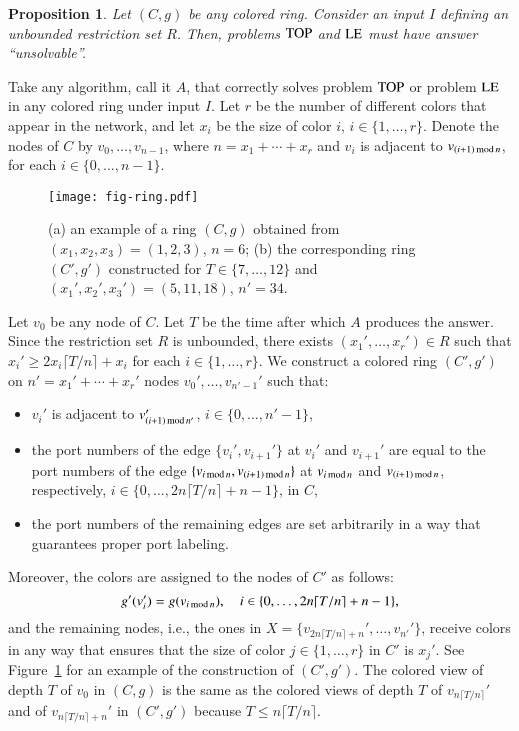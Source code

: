 \documentclass[a4paper,10pt]{article}
\newtheorem{proposition}{Proposition}[section]
\newcommand{\modulo}{\,\textup{mod}\,}
\newcommand{\problemLE}{\textup{LE}}
\newcommand{\problemTOP}{\textup{TOP}}
\newenvironment{proof}[1][Proof]
{\par\noindent{\bf #1:} }{\hspace*{\fill}\nolinebreak{$\Box$}\bigskip\par}
\begin{document}
\begin{proposition}
Let $(C,g)$ be any colored ring.
Consider an input $I$ defining an unbounded restriction set $R$.
Then, problems $\problemTOP$ and $\problemLE$ must have answer ``unsolvable''.
\end{proposition}
\begin{proof}
Take any algorithm, call it $A$, that correctly solves problem $\problemTOP$ or problem $\problemLE$ in any colored ring under input $I$.
Let $r$ be the number of different colors that appear in the network, and let $x_i$ be the size of color $i$, $i\in\{1,\ldots,r\}$.
Denote the nodes of $C$ by $v_0,\ldots,v_{n-1}$, where $n=x_1+\cdots+x_r$ and $v_i$ is adjacent to $v_{(i+1)\modulo n}$, for each $i\in\{0,\ldots,n-1\}$.
\begin{figure}[htb]
\begin{center}
\texttt{[image: fig-ring.pdf]}
\caption{(a) an example of a ring $(C,g)$ obtained from $(x_1,x_2,x_3)=(1,2,3)$, $n=6$; (b) the corresponding ring $(C',g')$ constructed for $T\in\{7,\ldots,12\}$ and $(x_1',x_2',x_3')=(5,11,18)$, $n'=34$.}
\label{fig:ring}
\end{center}
\end{figure}

Let $v_0$ be any node of $C$.
Let $T$ be the time after which $A$ produces the answer.
Since the restriction set $R$ is unbounded, there exists $(x_1',\ldots,x_r')\in R$ such that $x_i'\geq 2x_i\lceil T/n\rceil+x_i$ for each $i\in\{1,\ldots,r\}$.
We construct a colored ring $(C',g')$ on $n'=x_1'+\cdots+x_r'$ nodes $v_0',\ldots,v_{n'-1}'$ such that:
\begin{itemize}
 \item $v_i'$ is adjacent to $v_{(i+1)\modulo n'}'$, $i\in\{0,\ldots,n'-1\}$,
 \item the port numbers of the edge $\{v_i',v_{i+1}'\}$ at $v_i'$ and $v_{i+1}'$ are equal to the port numbers of the edge $\{v_{i\modulo n},v_{(i+1)\modulo n}\}$ at $v_{i\modulo n}$ and $v_{(i+1)\modulo n}$, respectively, $i\in\{0,\ldots,2n\lceil T/n\rceil+n-1\}$, in $C$,
 \item the port numbers of the remaining edges are set arbitrarily in a way that guarantees proper port labeling.
\end{itemize}
Moreover, the colors are assigned to the nodes of $C'$ as follows:
\[g'(v_{i}')=g(v_{i\modulo n}), \quad i\in\{0,\ldots,2n \lceil T/n\rceil+n-1\},\]
and the remaining nodes, i.e., the ones in $X=\{v_{2n \lceil T/n\rceil+n}',\ldots,v_{n'}'\}$, receive colors in any way that ensures that the size of color $j\in\{1,\ldots,r\}$ in $C'$ is $x_j'$.
See Figure~\ref{fig:ring} for an example of the construction of $(C',g')$.
The colored view of depth $T$ of $v_0$ in $(C,g)$ is the same as the colored views of depth $T$ of $v_{n \lceil T/n\rceil}'$ and of $v_{n \lceil T/n\rceil+n}'$ in $(C',g')$ because $T\leq n \lceil T/n\rceil$.


\end{proof}
\end{document}
